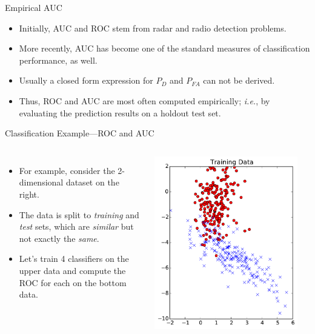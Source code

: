 \documentclass[10pt, aspectratio=169]{beamer} %
\begin{document}
\begin{frame}[allowframebreaks=0.8]
 {Empirical AUC}
\begin{itemize}
\item Initially, AUC and ROC stem from radar and radio detection problems.
\item More recently, AUC has become one of the standard measures of classification performance, as well.
\item Usually a closed form expression for $P_D$ and $P_{FA}$ can not be derived.
\item Thus, ROC and AUC are most often computed empirically;\textit{ i.e.}, by evaluating the prediction results
on a holdout test set.
\end{itemize}
\end{frame}

\begin{frame}{Classification Example---ROC and AUC}
\begin{columns}
\begin{itemize}
\item For example, consider the 2-dimensional dataset on the right.
\item The data is split to \textit{training} and \textit{test} sets, which
are \textit{similar} but not exactly the \textit{same}.
\item Let's train 4 classifiers on the upper data and compute the ROC 
for each on the bottom data.
\end{itemize}
\centerline{\includegraphics[width=0.8\columnwidth]{TrainingData_2class.pdf}}\\

\end{columns}
\end{frame}
\end{document}
